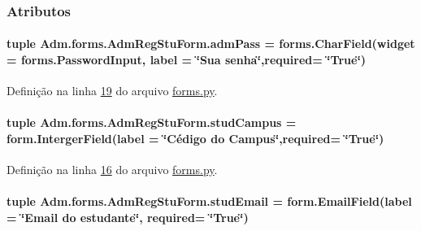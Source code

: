 \subsubsection{Atributos}
\hypertarget{classAdm_1_1forms_1_1AdmRegStuForm_aa2463e5a3bdc53561cf1a1212099b8ca}{
\paragraph[{adm\-Pass}]{\setlength{\rightskip}{0pt plus 5cm}tuple Adm.\-forms.\-Adm\-Reg\-Stu\-Form.\-adm\-Pass = forms.\-Char\-Field(widget = forms.\-Password\-Input, label = \char`\"{}Sua senha\char`\"{},required= \char`\"{}True\char`\"{})\hspace{0.3cm}{\ttfamily [static]}}}\label{classAdm_1_1forms_1_1AdmRegStuForm_aa2463e5a3bdc53561cf1a1212099b8ca}


Definição na linha \hyperlink{Adm_2forms_8py_source_l00019}{19} do arquivo \hyperlink{Adm_2forms_8py_source}{forms.\-py}.

\hypertarget{classAdm_1_1forms_1_1AdmRegStuForm_ad626ad8ba2b3609252db029fba8112c1}{
\paragraph[{stud\-Campus}]{\setlength{\rightskip}{0pt plus 5cm}tuple Adm.\-forms.\-Adm\-Reg\-Stu\-Form.\-stud\-Campus = form.\-Interger\-Field(label = \char`\"{}Cédigo do Campus\char`\"{},required= \char`\"{}True\char`\"{})\hspace{0.3cm}{\ttfamily [static]}}}\label{classAdm_1_1forms_1_1AdmRegStuForm_ad626ad8ba2b3609252db029fba8112c1}


Definição na linha \hyperlink{Adm_2forms_8py_source_l00016}{16} do arquivo \hyperlink{Adm_2forms_8py_source}{forms.\-py}.

\hypertarget{classAdm_1_1forms_1_1AdmRegStuForm_a7bb9d477582961bb017d459d7beb2a48}{
\paragraph[{stud\-Email}]{\setlength{\rightskip}{0pt plus 5cm}tuple Adm.\-forms.\-Adm\-Reg\-Stu\-Form.\-stud\-Email = form.\-Email\-Field(label = \char`\"{}Email do estudante\char`\"{}, required= \char`\"{}True\char`\"{})\hspace{0.3cm}{\ttfamily [static]}}}\label{classAdm_1_1forms_1_1AdmRegStuForm_a7bb9d477582961bb017d459d7beb2a48}


